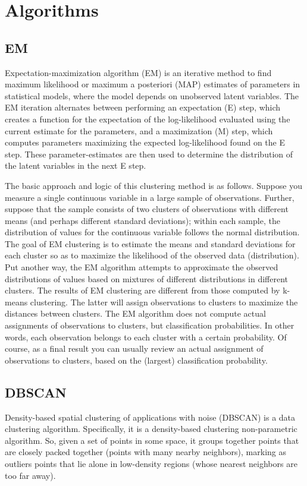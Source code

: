 \section{Algorithms}
\subsection{EM}
Expectation-maximization algorithm (EM) \cite{em,wiki_em,rapid_em} is an iterative method to find maximum likelihood or maximum a posteriori (MAP) estimates of parameters in statistical models, where the model depends on unobserved latent variables. The EM iteration alternates between performing an expectation (E) step, which creates a function for the expectation of the log-likelihood evaluated using the current estimate for the parameters, and a maximization (M) step, which computes parameters maximizing the expected log-likelihood found on the E step. These parameter-estimates are then used to determine the distribution of the latent variables in the next E step.

The basic approach and logic of this clustering method is as follows. Suppose you measure a single continuous variable in a large sample of observations. Further, suppose that the sample consists of two clusters of observations with different means (and perhaps different standard deviations); within each sample, the distribution of values for the continuous variable follows the normal distribution. The goal of EM clustering is to estimate the means and standard deviations for each cluster so as to maximize the likelihood of the observed data (distribution). Put another way, the EM algorithm attempts to approximate the observed distributions of values based on mixtures of different distributions in different clusters. The results of EM clustering are different from those computed by k-means clustering. The latter will assign observations to clusters to maximize the distances between clusters. The EM algorithm does not compute actual assignments of observations to clusters, but classification probabilities. In other words, each observation belongs to each cluster with a certain probability. Of course, as a final result you can usually review an actual assignment of observations to clusters, based on the (largest) classification probability.

\subsection{DBSCAN}
Density-based spatial clustering of applications with noise (DBSCAN) \cite{dbscan,wiki_dbscan} is a data clustering algorithm. Specifically, it is a density-based clustering non-parametric algorithm. So, given a set of points in some space, it groups together points that are closely packed together (points with many nearby neighbors), marking as outliers points that lie alone in low-density regions (whose nearest neighbors are too far away).


